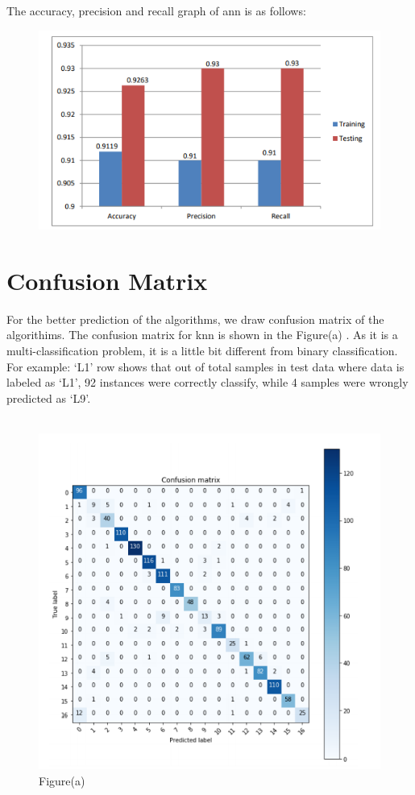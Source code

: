 The  accuracy, precision and recall graph of ann is as follows:

\begin{figure}[h]
  		\centering
    		\includegraphics[scale=0.9]{./Figures/cmgraph}
 		\end{figure}

\pagebreak
\section{Confusion Matrix}

For the better prediction of the algorithms, we draw confusion matrix of the algorithims. The confusion matrix for knn is shown in the Figure(a) . As it is a multi-classification problem, it is a little bit different from binary classification. For example: ‘L1’ row shows that out of total samples in test data where data is labeled as ‘L1’, 92 instances were correctly classify, while 4 samples were wrongly predicted as ‘L9’.
\\\\
\begin{figure}[h]

  		\centering
    		\includegraphics[scale=0.7]{./Figures/cm}
\\Figure(a)
 		\end{figure}


